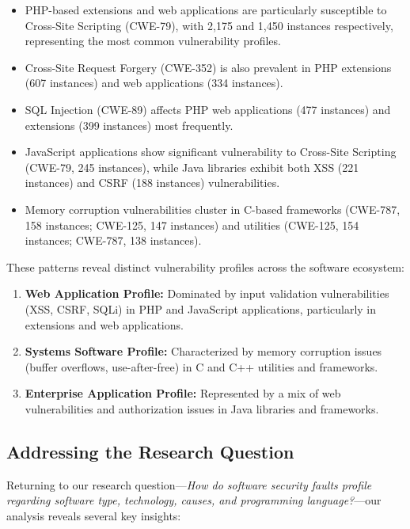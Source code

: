 \begin{itemize}
    \item PHP-based extensions and web applications are particularly susceptible to Cross-Site Scripting (CWE-79), with 2,175 and 1,450 instances respectively, representing the most common vulnerability profiles.
    \item Cross-Site Request Forgery (CWE-352) is also prevalent in PHP extensions (607 instances) and web applications (334 instances).
    \item SQL Injection (CWE-89) affects PHP web applications (477 instances) and extensions (399 instances) most frequently.
    \item JavaScript applications show significant vulnerability to Cross-Site Scripting (CWE-79, 245 instances), while Java libraries exhibit both XSS (221 instances) and CSRF (188 instances) vulnerabilities.
    \item Memory corruption vulnerabilities cluster in C-based frameworks (CWE-787, 158 instances; CWE-125, 147 instances) and utilities (CWE-125, 154 instances; CWE-787, 138 instances).
\end{itemize}

These patterns reveal distinct vulnerability profiles across the software ecosystem:

\begin{enumerate}
    \item \textbf{Web Application Profile:} Dominated by input validation vulnerabilities (XSS, CSRF, SQLi) in PHP and JavaScript applications, particularly in extensions and web applications.
    \item \textbf{Systems Software Profile:} Characterized by memory corruption issues (buffer overflows, use-after-free) in C and C++ utilities and frameworks.
    \item \textbf{Enterprise Application Profile:} Represented by a mix of web vulnerabilities and authorization issues in Java libraries and frameworks.
\end{enumerate}

\subsection{Addressing the Research Question}

Returning to our research question—\textit{How do software security faults profile regarding software type, technology, causes, and programming language?}—our analysis reveals several key insights:

